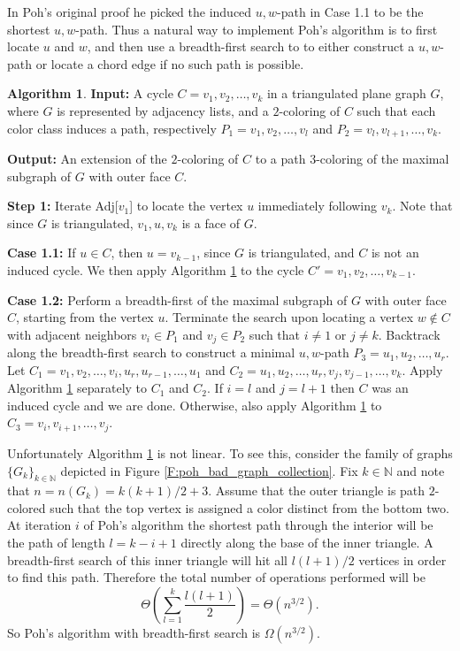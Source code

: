 \documentclass[12pt,letterpaper]{article}
\theoremstyle{plain}
\theoremstyle{definition}
\theoremstyle{break}
\newtheorem{algorithm}[lemma]{Algorithm}     %
\begin{document}
In Poh's original proof he picked the induced $u,w$-path in Case 1.1 to be the
shortest $u,w$-path.
Thus a natural way to implement Poh's algorithm is to first locate $u$ and $w$,
and then use a breadth-first search to
to either construct a $u,w$-path or locate
a chord edge if no such path is possible.

\begin{algorithm}\label{A:poh_bfs}
\textbf{Input:} A cycle $C=v_1,v_2,\ldots,v_k$ in a triangulated plane
graph $G$, where $G$ is represented by adjacency lists, and a $2$-coloring of $C$ such
that each color class induces a path, respectively $P_1=v_1,v_2,\ldots,v_l$ and
$P_2=v_l,v_{l+1},\ldots,v_k$.

\noindent\textbf{Output:} An extension of the $2$-coloring of $C$ to a path
$3$-coloring of the maximal subgraph of $G$ with outer face $C$.

\noindent\textbf{Step 1:} Iterate Adj[$v_1$] to locate the vertex $u$
immediately following $v_k$. Note that since $G$ is triangulated, $v_1,u,v_k$ is
a face of $G$.

\noindent\textbf{Case 1.1:} If $u\in C$, then $u=v_{k-1}$, since $G$ is
triangulated, and $C$ is not an induced cycle. We then
apply Algorithm \ref{A:poh_bfs} to the cycle $C'=v_1,v_2,\ldots,v_{k-1}$.

\noindent\textbf{Case 1.2:} Perform a breadth-first of the maximal subgraph of
$G$ with outer face $C$, starting from the
vertex $u$. Terminate the search upon locating a vertex $w\not\in C$ with adjacent
neighbors $v_i\in P_1$ and $v_j\in P_2$ such that $i\ne 1$ or $j\ne k$.
Backtrack along the breadth-first search
to construct a minimal $u,w$-path $P_3=u_1,u_2,\ldots,u_r$. Let
$C_1=v_1,v_2,\ldots,v_i,u_r,u_{r-1},\ldots,u_1$ and
$C_2=u_1,u_2,\ldots,u_r,v_j,v_{j-1},\ldots,v_k$. Apply Algorithm \ref{A:poh_bfs}
separately to $C_1$ and $C_2$. If $i=l$ and $j={l+1}$ then $C$ was an induced
cycle and we are done. Otherwise, also apply Algorithm \ref{A:poh_bfs} to
$C_3=v_i,v_{i+1},\ldots,v_j$.
\end{algorithm}

Unfortunately Algorithm \ref{A:poh_bfs}
is not linear. To see this, consider the family of
graphs $\{G_k\}_{k\in\mathbb{N}}$ depicted in
Figure \ref{F:poh_bad_graph_collection}. Fix $k\in\mathbb{N}$ and note that
$n=n(G_k)=k(k+1)/2+3$. Assume
that the outer triangle is path $2$-colored such that the top vertex is
assigned a color distinct from the bottom two. At iteration $i$ of Poh's
algorithm the shortest path through the interior will be the path of length
$l=k-i+1$ directly along the base of the inner triangle. A breadth-first search
of this inner triangle will hit all $l(l+1)/2$ vertices in order to find this
path. Therefore the total number of operations performed will be
\[
    \Theta\left( \sum_{l=1}^k\frac{l(l+1)}{2} \right)=\Theta(n^{3/2}).
\]
So Poh's algorithm with breadth-first search is $\Omega(n^{3/2})$.
\end{document}
